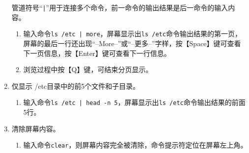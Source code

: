\begin{enumerate}
    管道符号“\verb=|=”用于连接多个命令，前一命令的输出结果是后一命令的输入内容。
    \begin{enumerate}
      \item 输入命令\verb=ls /etc | more=，屏幕显示出\verb|ls /etc|命令输出结果的第一页，屏幕的最后一行还出现“--More--”或“--更多--”字样，按【Space】键可查看下一页信息，按【Enter】键可查看下一行信息。
      \item 浏览过程中按【Q】键，可结束分页显示。
    \end{enumerate}
  \item 仅显示 /etc目录中的前5个文件和子目录。
    \begin{enumerate}
      \item 输入命令\verb=ls /etc | head -n 5=，屏幕显示出\verb|ls /etc|命令输出结果的前面5行。
    \end{enumerate}
  \item 清除屏幕内容。
    \begin{enumerate}
      \item 输入命令\verb|clear|，则屏幕内容完全被清除，命令提示符定位在屏幕左上角。
    \end{enumerate}
\end{enumerate}


